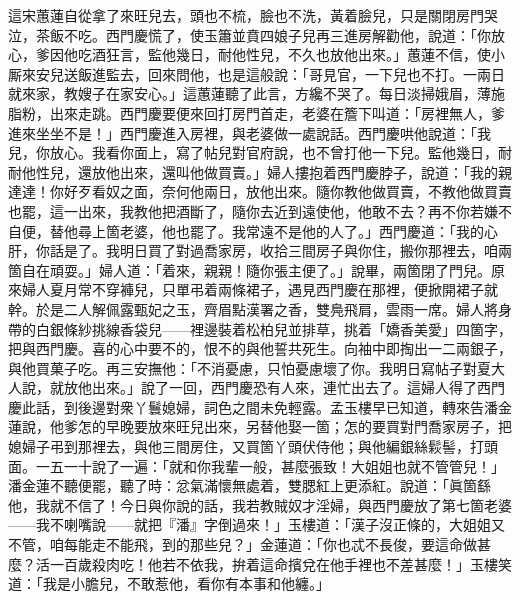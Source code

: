 這宋蕙蓮自從拿了來旺兒去，頭也不梳，臉也不洗，黃着臉兒，只是關閉房門哭泣，茶飯不吃。西門慶慌了，使玉簫並賁四娘子兒再三進房解勸他，說道：「你放心，爹因他吃酒狂言，監他幾日，耐他性兒，不久也放他出來。」蕙蓮不信，使小厮來安兒送飯進監去，回來問他，也是這般說：「哥見官，一下兒也不打。一兩日就來家，教嫂子在家安心。」這蕙蓮聽了此言，方纔不哭了。每日淡掃娥眉，薄施脂粉，出來走跳。西門慶要便來回打房門首走，老婆在簷下叫道：「房裡無人，爹進來坐坐不是！」西門慶進入房裡，與老婆做一處說話。西門慶哄他說道：「我兒，你放心。我看你面上，寫了帖兒對官府說，也不曾打他一下兒。監他幾日，耐耐他性兒，還放他出來，還叫他做買賣。」婦人摟抱着西門慶脖子，說道：「我的親達達！你好歹看奴之面，{}奈何他兩日，放他出來。隨你教他做買賣，不教他做買賣也罷，這一出來，我教他把酒斷了，隨你去近到遠使他，他敢不去？再不你若嫌不自便，替他尋上箇老婆，他也罷了。我常遠不是他的人了。」西門慶道：「我的心肝，你話是了。我明日買了對過喬家房，收拾三間房子與你住，搬你那裡去，咱兩箇自在頑耍。」婦人道：「着來，親親！隨你張主便了。」說畢，兩箇閉了門兒。原來婦人夏月常不穿褲兒，只單弔着兩條裙子，遇見西門慶在那裡，便掀開裙子就幹。於是二人解佩露甄妃之玉，齊眉點漢署之香，雙鳧飛肩，雲雨一席。婦人將身帶的白銀條紗挑線香袋兒——裡邊裝着松柏兒並排草，挑着「嬌香美愛」四箇字，把與西門慶。喜的心中要不的，恨不的與他誓共死生。向袖中即掏出一二兩銀子，與他買菓子吃。再三安撫他：「不消憂慮，只怕憂慮壞了你。我明日寫帖子對夏大人說，就放他出來。」說了一回，西門慶恐有人來，連忙出去了。這婦人得了西門慶此話，到後邊對衆丫鬟媳婦，詞色之間未免輕露。{}孟玉樓早已知道，轉來告潘金蓮說，他爹怎的早晚要放來旺兒出來，另替他娶一箇；怎的要買對門喬家房子，把媳婦子弔到那裡去，與他三間房住，又買箇丫頭伏侍他；與他編銀絲鬏髻，打頭面。一五一十說了一遍：「就和你我輩一般，甚麼張致！大姐姐也就不管管兒！」潘金蓮不聽便罷，聽了時：忿氣滿懷無處着，雙腮紅上更添紅。說道：「眞箇繇他，我就不信了！今日與你說的話，我若教賊奴才淫婦，與西門慶放了第七箇老婆——我不喇嘴說——就把『潘』字倒過來！」玉樓道：「漢子沒正條的，大姐姐又不管，咱每能走不能飛，到的那些兒？」{}金蓮道：「你也忒不長俊，要這命做甚麼？活一百歲殺肉吃！他若不依我，拚着這命擯兌在他手裡也不差甚麼！」玉樓笑道：「我是小膽兒，不敢惹他，看你有本事和他纏。」

